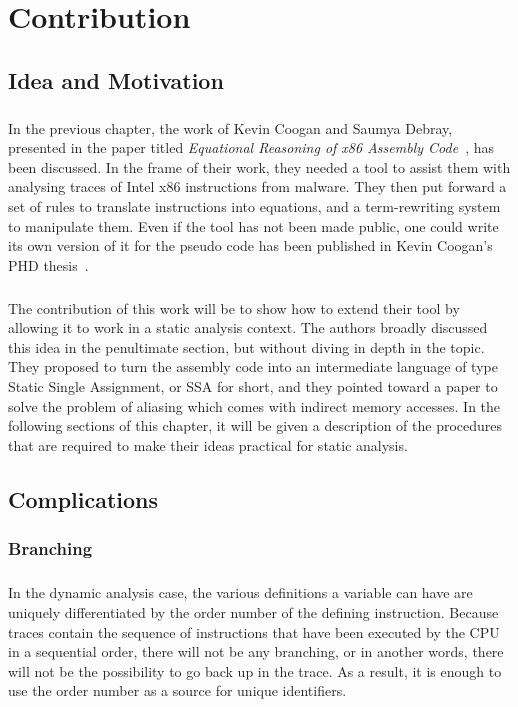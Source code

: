 \chapter{Contribution} \label{chapter:contribution}
\section{Idea and Motivation}
\paragraph{}
In the previous chapter, the work of Kevin Coogan and Saumya Debray, presented in the paper titled \textit{Equational Reasoning of x86 Assembly Code}~\cite{coogan2011equational}, has been discussed. In the frame of their work, they needed a tool to assist them with analysing traces of Intel x86 instructions from malware. They then put forward a set of rules to translate instructions into equations, and a term-rewriting system to manipulate them. Even if the tool has not been made public, one could write its own version of it for the pseudo code has been published in Kevin Coogan's PHD thesis~\cite{coogan2011deobfuscation}.

\paragraph{}
The contribution of this work will be to show how to extend their tool by allowing it to work in a static analysis context. The authors broadly discussed this idea in the penultimate section, but without diving in depth in the topic. They proposed to turn the assembly code into an intermediate language of type Static Single Assignment, or SSA for short, and they pointed toward a paper to solve the problem of aliasing which comes with indirect memory accesses. In the following sections of this chapter, it will be given a description of the procedures that are required to make their ideas practical for static analysis.

\section{Complications}
\subsection{Branching}
\paragraph{}
In the dynamic analysis case, the various definitions a variable can have are uniquely differentiated by the order number of the defining instruction. Because traces contain the sequence of instructions that have been executed by the CPU in a sequential order, there will not be any branching, or in another words, there will not be the possibility to go back up in the trace. As a result, it is enough to use the order number as a source for unique identifiers. 

